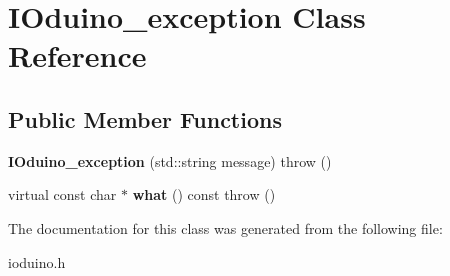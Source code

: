 \hypertarget{classIOduino__exception}{
\section{IOduino\_\-exception Class Reference}
\label{classIOduino__exception}
}
\subsection*{Public Member Functions}
\begin{DoxyCompactItemize}
\item 
\hypertarget{classIOduino__exception_a66855761e442525550fa22dd255d15fc}{
{\bfseries IOduino\_\-exception} (std::string message)  throw ()}
\label{classIOduino__exception_a66855761e442525550fa22dd255d15fc}

\item 
\hypertarget{classIOduino__exception_a4beb3d2a9bc33454c552397a88b3630f}{
virtual const char $\ast$ {\bfseries what} () const   throw ()}
\label{classIOduino__exception_a4beb3d2a9bc33454c552397a88b3630f}

\end{DoxyCompactItemize}


The documentation for this class was generated from the following file:\begin{DoxyCompactItemize}
\item 
ioduino.h\end{DoxyCompactItemize}
